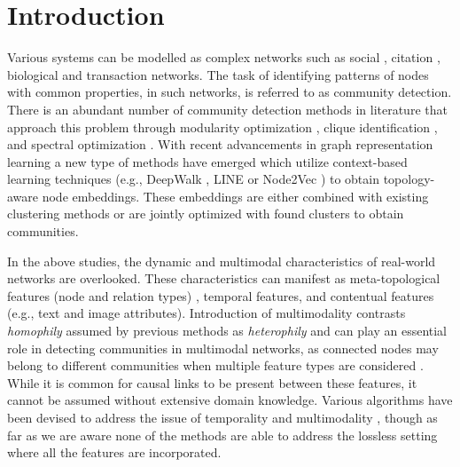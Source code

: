 \chapter{Introduction}

Various systems can be modelled as complex networks such as 
social \cite{hagenCrisisCommunicationsAge2018}, citation \cite{mccallumAutomatingConstructionInternet2000, senCollectiveClassificationNetwork2008}, biological \cite{gosakNetworkScienceBiological2018} and transaction \cite{prykeAnalysingConstructionProject2004} networks.
The task of identifying patterns of nodes with common properties, in such networks, is referred to as community detection.
% 
There is an abundant number of community detection methods in literature that approach this problem through modularity optimization \cite{newmanFastAlgorithmDetecting2004, blondelFastUnfoldingCommunities2008, schuetzMultistepGreedyAlgorithm2008}, clique identification \cite{farkasWeightedNetworkModules2007, kumpulaSequentialAlgorithmFast2008}, and spectral optimization \cite{wangCommunityDiscoveryUsing2011, heLaplacianRegularizedGaussian2011}.
With recent advancements in graph representation learning a new type of methods have emerged which 
utilize context-based learning techniques (e.g., DeepWalk \cite{perozziDeepWalkOnlineLearning2014}, LINE \cite{tangLINELargescaleInformation2015} or Node2Vec \cite{groverNode2vecScalableFeature2016}) to obtain topology-aware node embeddings.
These embeddings are either combined with existing clustering methods \cite{caoIncorporatingNetworkStructure2018, xueCrossdomainNetworkRepresentations2019}
or are jointly optimized with found clusters 
\cite{cavallariLearningCommunityEmbedding2017, rozemberczkiGEMSECGraphEmbedding2019, jiaCommunityGANCommunityDetection2019}
to obtain communities.

In the above studies, the dynamic and multimodal characteristics of real-world networks are overlooked. 
These characteristics can manifest as meta-topological features (node and relation types) \cite{caoKnowledgePreservingIncrementalSocial2021}, temporal features, and contentual features (e.g., text and image attributes).
%
Introduction of multimodality contrasts \textit{homophily} assumed by previous methods as \textit{heterophily} and can play an essential role in detecting communities in multimodal networks, as connected nodes may belong to different communities when multiple feature types are considered \cite{zhuHomophilyGraphNeural}.  
% 
While it is common for causal links to be present between these features, it cannot be assumed without extensive domain knowledge.
% 
Various algorithms have been devised to address the issue of temporality and multimodality \cite{greeneTrackingEvolutionCommunities2010, luoDetectingCommunitiesHeterogeneous2021, liCommunityDetectionAttributed2018, faniUserCommunityDetection2020}, 
though as far as we are aware none of the methods are able to address the lossless setting where all the features are incorporated.

